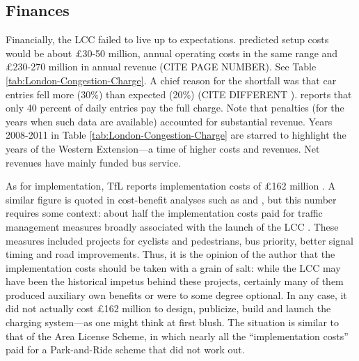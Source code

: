
\subsection{Finances}

Financially, the LCC failed to live up to expectations. \citet{ROCOL2000} predicted setup costs would be about \pounds30-50 million, annual operating costs in the same range and \pounds230-270 million in annual revenue (CITE PAGE NUMBER). See Table \ref{tab:London-Congestion-Charge}. A chief reason for the shortfall was that car entries fell more (30\%) than expected (20\%) (CITE DIFFERENT \citep[p.169]{Leape2006}). \citet{TfLExPost2007} reports that only 40 percent of daily entries pay the full charge. Note that penalties (for the years when such data are available) accounted for substantial revenue. Years 2008-2011 in Table \ref{tab:London-Congestion-Charge} are starred to highlight the years of the Western Extension---a time of higher costs and revenues. Net revenues have mainly funded bus service.
 


As for implementation, TfL reports implementation costs of \pounds162 million \citep[p. 135]{TfLFifth2007}. A similar figure is quoted in cost-benefit analyses such as \citet{Leape2006} and \citet{Prudhomme2005}, but this number requires some context: about half the implementation costs paid for traffic management measures broadly associated with the launch of the LCC \citep[pp. 132-133,138]{Richards2006}. These measures included projects for cyclists and pedestrians, bus priority, better signal timing and road improvements. Thus, it is the opinion of the author that the implementation costs should be taken with a grain of salt: while the LCC may have been the historical impetus behind these projects, certainly many of them produced auxiliary own benefits or were to some degree optional. In any case, it did not actually cost \pounds 162 million to design, publicize, build and launch the charging system---as one might think at first blush. The situation is similar to that of the Area License Scheme, in which nearly all the ``implementation costs'' paid for a Park-and-Ride scheme that did not work out.



